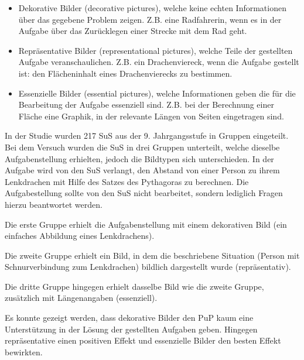     \begin{itemize}
        \item Dekorative Bilder (decorative pictures), welche keine echten Informationen über das gegebene Problem zeigen. Z.B. eine Radfahrerin, wenn es in der Aufgabe über das Zurücklegen einer Strecke mit dem Rad geht.
        \item Repräsentative Bilder (representational pictures), welche Teile der gestellten Aufgabe veranschaulichen. Z.B. ein Drachenviereck, wenn die Aufgabe gestellt ist: den Flächeninhalt eines Drachenvierecks zu bestimmen. 
        \item Essenzielle Bilder (essential pictures), welche Informationen geben die für die Bearbeitung der Aufgabe essenziell sind. Z.B. bei der Berechnung einer Fläche eine Graphik, in der relevante Längen von Seiten eingetragen sind.
    \end{itemize}

In der Studie wurden 217 \gls{SuS} aus der 9. Jahrgangsstufe in Gruppen eingeteilt. Bei dem Versuch wurden die \gls{SuS} in drei Gruppen unterteilt, welche dieselbe Aufgabenstellung erhielten, jedoch die Bildtypen sich unterschieden. In der Aufgabe wird von den \gls{SuS} verlangt, den Abstand von einer Person zu ihrem Lenkdrachen mit Hilfe des Satzes des Pythagoras zu berechnen. Die Aufgabestellung sollte von den \gls{SuS} nicht bearbeitet, sondern lediglich Fragen hierzu beantwortet werden. 


Die erste Gruppe erhielt die Aufgabenstellung mit einem dekorativen Bild (ein einfaches Abbildung eines Lenkdrachens).


Die zweite Gruppe erhielt ein Bild, in dem die beschriebene Situation (Person mit Schnurverbindung zum Lenkdrachen) bildlich dargestellt wurde (repräsentativ).


Die dritte Gruppe hingegen erhielt dasselbe Bild wie die zweite Gruppe, zusätzlich mit Längenangaben (essenziell).


Es konnte gezeigt werden, dass dekorative Bilder den \gls{PuP} kaum eine Unterstützung in der Lösung der gestellten Aufgaben geben. Hingegen repräsentative einen positiven Effekt und essenzielle Bilder den besten Effekt bewirkten.

